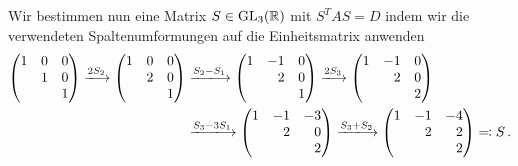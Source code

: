 Wir bestimmen nun eine Matrix $S \in \operatorname{GL}_{3}(\mathbb{R})$ mit $S^T A S = D$ indem wir die verwendeten Spaltenumformungen auf die Einheitsmatrix anwenden
\begin{align*}
  \begin{pmatrix*}[r]
    1 & 0 & 0 \\ 
      & 1 & 0 \\
      &   & 1 \\
  \end{pmatrix*}
  \xlongrightarrow{2 S_2}
  \begin{pmatrix*}[r]
    1 & 0 & 0 \\ 
      & 2 & 0 \\
      &   & 1 \\
  \end{pmatrix*}
  &\xlongrightarrow{S_2 - S_1}
  \begin{pmatrix*}[r]
    1 & -1  & 0 \\ 
      &  2  & 0 \\
      &     & 1 \\
  \end{pmatrix*}
  \xlongrightarrow{2 S_3}
  \begin{pmatrix*}[r]
    1 & -1  & 0 \\ 
      &  2  & 0 \\
      &     & 2 \\
  \end{pmatrix*}
  \\
  &\xlongrightarrow{S_3 - 3 S_1}
  \begin{pmatrix*}[r]
    1 & -1  & -3  \\ 
      &  2  &  0  \\
      &     &  2  \\
  \end{pmatrix*}
  \xlongrightarrow{S_3 + S_2}
  \begin{pmatrix*}[r]
    1 & -1  & -4  \\ 
      &  2  &  2  \\
      &     &  2  \\
  \end{pmatrix*}
  \eqqcolon
  S \,.
\end{align*}





\subsection{}

